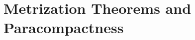 \documentclass[../main.tex]{subfiles}
\begin{document}
\chapter{Metrization Theorems and Paracompactness}
%
\todo{}
\end{document}
